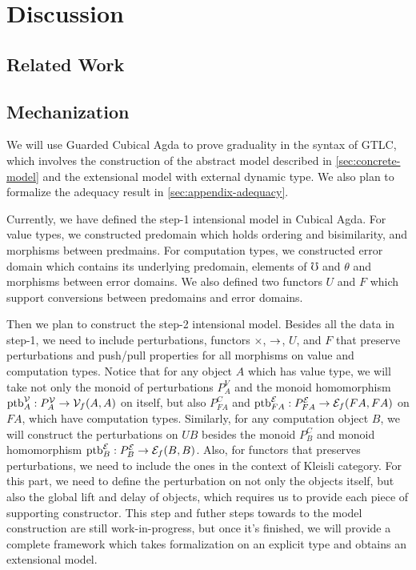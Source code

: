 \section{Discussion}

\subsection{Related Work}


\subsection{Mechanization}
We will use Guarded Cubical Agda to prove graduality in the syntax of 
GTLC, which involves the construction of the abstract model described in 
\ref{sec:concrete-model} and the extensional model with external dynamic 
type. We also plan to formalize the adequacy result in \ref{sec:appendix-adequacy}.

Currently, we have defined the step-1 intensional model in Cubical 
Agda. For value types, we constructed predomain which holds ordering and 
bisimilarity, and morphisms between predmains. For computation types, we 
constructed error domain which contains its underlying predomain, 
elements of $\mho$ and $\theta$ and morphisms between error domains. We 
also defined two functors $U$ and $F$ which support conversions between 
predomains and error domains.

Then we plan to construct the step-2 intensional model. Besides all the 
data in step-1, we need to include perturbations, functors $\times$, $\to$, $U$, and $F$ that preserve 
perturbations and push/pull properties for all morphisms on value and 
computation types. Notice that for any object $A$ which has value type, 
we will take not only the monoid of perturbations $P^V_A$ and the monoid 
homomorphism $\text{ptb}^\mathcal{V}_A : P^{\mathcal{V}}_A \to \mathcal{V}_f(A,A)$ on itself, but also $P^C_{F A}
$ and $\text{ptb}^\mathcal{E}_{F A} : P^{\mathcal{E}}_{F A} \to \mathcal{E}_f(F A,F A)$ on $F A$, which have 
computation types. Similarly, for any computation object $B$, we will 
construct the perturbations on $U B$ besides the monoid $P^C_B$ and 
monoid homomorphism $\text{ptb}^\mathcal{E}_B : P^{\mathcal{E}}_B \to \mathcal{E}_f(B,B)$. Also, for functors 
that preserves perturbations, we need to include the ones in the context 
of Kleisli category. For this part, we need to define the perturbation on 
not only the objects itself, but also the global lift and delay of objects, 
which requires us to provide each piece of supporting constructor. This step 
and futher steps towards to the model construction are still 
work-in-progress, but once it's finished, we will provide a complete 
framework which takes formalization on an explicit type and obtains an 
extensional model.

